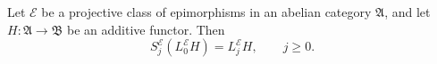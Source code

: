 Let $\mathcal{E}$ be a projective class of epimorphisms in an abelian category $\mathfrak{A}$, and let $H : \mathfrak{A} \to \mathfrak{B}$ be an additive functor. Then
\[
S_j^{\mathcal{E}}(L_0^{\mathcal{E}} H) = L_j^{\mathcal{E}} H, \qquad j \geq 0.
\]
